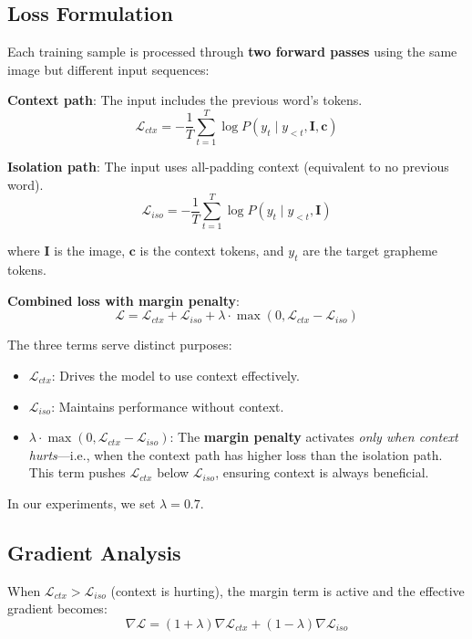 \documentclass[11pt, a4paper]{article}
\begin{document}
\subsection{Loss Formulation}

Each training sample is processed through \textbf{two forward passes} using the same image but different input sequences:

\textbf{Context path}: The input includes the previous word's tokens.
\[
\mathcal{L}_{ctx} = -\frac{1}{T}\sum_{t=1}^{T} \log P(y_t \mid y_{<t}, \mathbf{I}, \mathbf{c})
\]

\textbf{Isolation path}: The input uses all-padding context (equivalent to no previous word).
\[
\mathcal{L}_{iso} = -\frac{1}{T}\sum_{t=1}^{T} \log P(y_t \mid y_{<t}, \mathbf{I})
\]

where $\mathbf{I}$ is the image, $\mathbf{c}$ is the context tokens, and $y_t$ are the target grapheme tokens.

\textbf{Combined loss with margin penalty}:
\begin{equation}
\mathcal{L} = \mathcal{L}_{ctx} + \mathcal{L}_{iso} + \lambda \cdot \max(0, \mathcal{L}_{ctx} - \mathcal{L}_{iso})
\label{eq:dual_loss}
\end{equation}

The three terms serve distinct purposes:
\begin{itemize}
    \item $\mathcal{L}_{ctx}$: Drives the model to use context effectively.
    \item $\mathcal{L}_{iso}$: Maintains performance without context.
    \item $\lambda \cdot \max(0, \mathcal{L}_{ctx} - \mathcal{L}_{iso})$: The \textbf{margin penalty} activates \emph{only when context hurts}---i.e., when the context path has higher loss than the isolation path. This term pushes $\mathcal{L}_{ctx}$ below $\mathcal{L}_{iso}$, ensuring context is always beneficial.
\end{itemize}

In our experiments, we set $\lambda = 0.7$.

\subsection{Gradient Analysis}

When $\mathcal{L}_{ctx} > \mathcal{L}_{iso}$ (context is hurting), the margin term is active and the effective gradient becomes:
\[
\nabla \mathcal{L} = (1 + \lambda) \nabla \mathcal{L}_{ctx} + (1 - \lambda) \nabla \mathcal{L}_{iso}
\]
\end{document}
